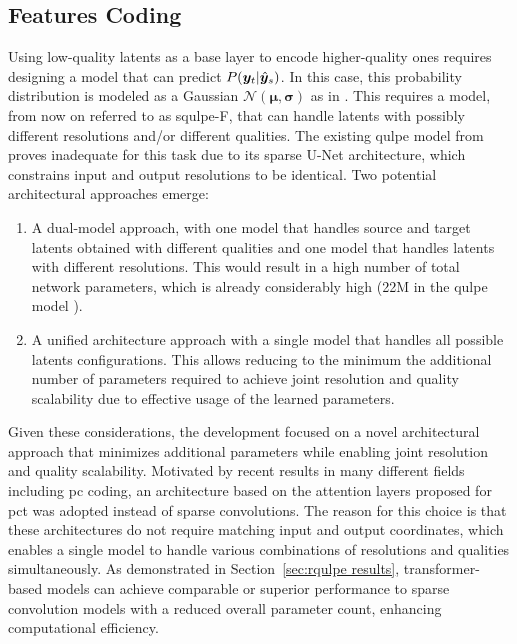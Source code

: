 \subsection{Features Coding}
Using low-quality latents as a base layer to encode higher-quality ones requires designing a model that can predict $P(\y_{t}| \hat{\y}_{s})$. In this case, this probability distribution is modeled as a Gaussian 
 $\mathcal{N}(\boldsymbol{\mu}, \boldsymbol{\sigma})$ as in \cite{minnen2018joint}. This requires a model, from now on referred to as \gls{squlpe}-F, that can handle latents with possibly different resolutions and/or different qualities.
The existing \gls{qulpe} model from \cite{mari2024point} proves inadequate for this task due to its sparse U-Net architecture, which constrains input and output resolutions to be identical. Two potential architectural approaches emerge:
\begin{enumerate}
    \item A dual-model approach, with one model that handles source and target latents obtained with different qualities and one model that handles latents with different resolutions.
This would result in a high number of total network parameters, which is already considerably high (22M in the \gls{qulpe} model \cite{mari2024point}).
    \item A unified architecture approach with a single model that handles all possible latents configurations. This allows reducing to the minimum the additional number of parameters required to achieve joint resolution and quality scalability due to effective usage of the learned parameters.
\end{enumerate}

Given these considerations, the development focused on a novel architectural approach that minimizes additional parameters while enabling joint resolution and quality scalability.
Motivated by recent results in many different fields including \gls{pc} coding, an architecture based on the attention layers proposed for \gls{pct} \cite{wu2022point} was adopted instead of sparse convolutions. 
The reason for this choice is that these architectures do not require matching input and output coordinates, which enables a single model to handle various combinations of resolutions and qualities simultaneously. As demonstrated in Section~\ref{sec:rqulpe results}, transformer-based models can achieve comparable or superior performance to sparse convolution models with a reduced overall parameter count, enhancing computational efficiency.

